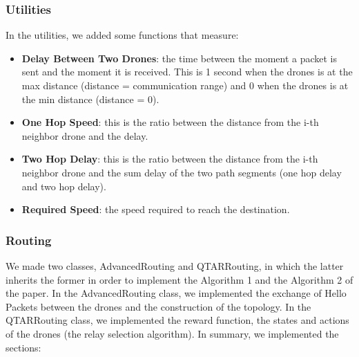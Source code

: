 \subsubsection{Utilities}
In the utilities, we added some functions that measure:
\begin{itemize}
    \item \textbf{Delay Between Two Drones}: the time between the moment a packet is sent and the moment it is received. This is 1 second when the drones is at the max distance (distance = communication range) and 0 when the drones is at the min distance (distance = 0).
    \item \textbf{One Hop Speed}: this is the ratio between the distance from the i-th neighbor drone and the delay.
    \item \textbf{Two Hop Delay}: this is the ratio between the distance from the i-th neighbor drone and the sum delay of the two path segments (one hop delay and two hop delay).
    \item \textbf{Required Speed}: the speed required to reach the destination.
\end{itemize}


\subsubsection{Routing}
We made two classes, AdvancedRouting and QTARRouting, in which the latter inherits the former in order to implement the Algorithm 1 and the Algorithm 2 of the paper.
In the AdvancedRouting class, we implemented the exchange of Hello Packets between the drones and the construction of the topology.
In the QTARRouting class, we implemented the reward function, the states and actions of the drones (the relay selection algorithm).
In summary, we implemented the sections:

